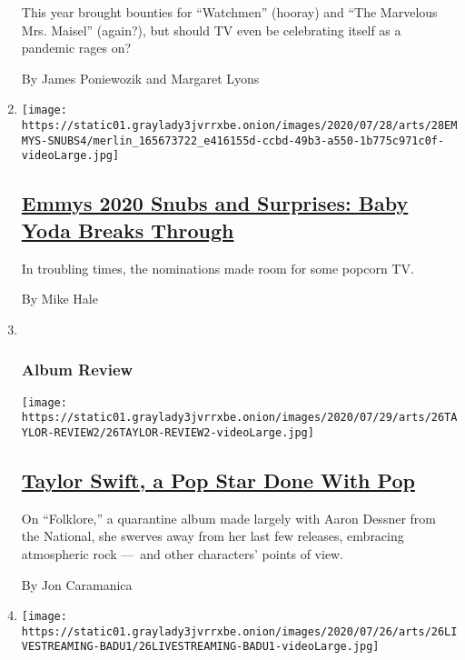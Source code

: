 \begin{enumerate}
  This year brought bounties for ``Watchmen'' (hooray) and ``The
  Marvelous Mrs. Maisel'' (again?), but should TV even be celebrating
  itself as a pandemic rages on?

  By James Poniewozik and Margaret Lyons
\item
  \texttt{[image: https://static01.graylady3jvrrxbe.onion/images/2020/07/28/arts/28EMMYS-SNUBS4/merlin\_165673722\_e416155d-ccbd-49b3-a550-1b775c971c0f-videoLarge.jpg]}

  \hypertarget{emmys-2020-snubs-and-surprises-baby-yoda-breaks-through}{%
  \subsection{\texorpdfstring{\href{/2020/07/28/arts/television/emmys-snubs-mandalorian-zendaya-reese.html}{Emmys
  2020 Snubs and Surprises: Baby Yoda Breaks
  Through}}{Emmys 2020 Snubs and Surprises: Baby Yoda Breaks Through}}\label{emmys-2020-snubs-and-surprises-baby-yoda-breaks-through}}

  In troubling times, the nominations made room for some popcorn TV.

  By Mike Hale
\item ~
  \hypertarget{album-review}{%
  \subsubsection{Album Review}\label{album-review}}

  \texttt{[image: https://static01.graylady3jvrrxbe.onion/images/2020/07/29/arts/26TAYLOR-REVIEW2/26TAYLOR-REVIEW2-videoLarge.jpg]}

  \hypertarget{taylor-swift-a-pop-star-done-with-pop}{%
  \subsection{\texorpdfstring{\href{/2020/07/26/arts/music/taylor-swift-folklore-review.html}{Taylor
  Swift, a Pop Star Done With
  Pop}}{Taylor Swift, a Pop Star Done With Pop}}\label{taylor-swift-a-pop-star-done-with-pop}}

  On ``Folklore,'' a quarantine album made largely with Aaron Dessner
  from the National, she swerves away from her last few releases,
  embracing atmospheric rock ---~and other characters' points of view.

  By Jon Caramanica
\item
  \texttt{[image: https://static01.graylady3jvrrxbe.onion/images/2020/07/26/arts/26LIVESTREAMING-BADU1/26LIVESTREAMING-BADU1-videoLarge.jpg]}


\end{enumerate}
